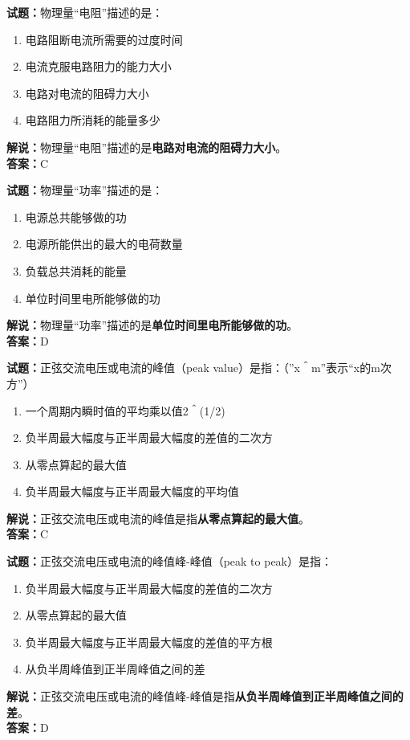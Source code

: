 \documentclass{ctexbook}
\begin{document}
\bigskip


\noindent\textbf{试题：}物理量“电阻”描述的是：
\begin{enumerate}[leftmargin=3em]
\item 电路阻断电流所需要的过度时间
\item 电流克服电路阻力的能力大小
\item 电路对电流的阻碍力大小
\item 电路阻力所消耗的能量多少
\end{enumerate}
\noindent\textbf{解说：}物理量“电阻”描述的是\textbf{电路对电流的阻碍力大小}。\\\noindent\textbf{答案：}C



\bigskip


\noindent\textbf{试题：}物理量“功率”描述的是：
\begin{enumerate}[leftmargin=3em]
\item 电源总共能够做的功
\item 电源所能供出的最大的电荷数量
\item 负载总共消耗的能量
\item 单位时间里电所能够做的功
\end{enumerate}
\noindent\textbf{解说：}物理量“功率”描述的是\textbf{单位时间里电所能够做的功}。\\\noindent\textbf{答案：}D



\bigskip


\noindent\textbf{试题：}正弦交流电压或电流的峰值（peak value）是指：（”x＾m”表示“x的m次方”）
\begin{enumerate}[leftmargin=3em]
\item 一个周期内瞬时值的平均乘以值2＾(1/2)
\item 负半周最大幅度与正半周最大幅度的差值的二次方
\item 从零点算起的最大值
\item 负半周最大幅度与正半周最大幅度的平均值
\end{enumerate}
\noindent\textbf{解说：}正弦交流电压或电流的峰值是指\textbf{从零点算起的最大值}。\\\noindent\textbf{答案：}C


\bigskip


\noindent\textbf{试题：}正弦交流电压或电流的峰值峰-峰值（peak to peak）是指：
\begin{enumerate}[leftmargin=3em]
\item 负半周最大幅度与正半周最大幅度的差值的二次方
\item 从零点算起的最大值
\item 负半周最大幅度与正半周最大幅度的差值的平方根
\item 从负半周峰值到正半周峰值之间的差
\end{enumerate}
\noindent\textbf{解说：}正弦交流电压或电流的峰值峰-峰值是指\textbf{从负半周峰值到正半周峰值之间的差}。\\\noindent\textbf{答案：}D
\end{document}
